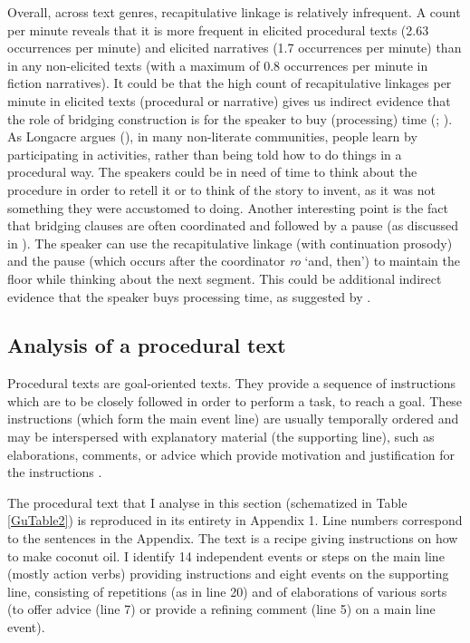 \documentclass[output=paper]{LSP/langsci}
\begin{document}
Overall, across text genres, recapitulative linkage is relatively infrequent. A count per minute reveals that it is more frequent in elicited procedural texts (2.63 occurrences per minute) and elicited narratives (1.7 occurrences per minute) than in any non-elicited texts (with a maximum of 0.8 occurrences per minute in fiction narratives). It could be that the high count of recapitulative linkages per minute in elicited texts (procedural or narrative) gives us indirect evidence that the role of bridging construction is for the speaker to buy (processing) time (\citealt[][378]{devries.2005}; \citeyear[][817]{devries.2006}). As Longacre argues (\citeyear[][9--10]{longacre83}), in many non-literate communities, people learn by participating in activities, rather than being told how to do things in a procedural way. The speakers could be in need of time to think about the procedure in order to retell it or to think of the story to invent, as it was not something they were accustomed to doing. Another interesting point is the fact that bridging clauses are often coordinated and followed by a pause (as discussed in ). The speaker can use the recapitulative linkage (with continuation prosody) and the pause (which occurs after the coordinator \textit{ro} `and, then') to maintain the floor while thinking about the next segment. This could be additional indirect evidence that the speaker buys processing time, as suggested by \citet[][817]{devries.2006}. 


\subsection{Analysis of a procedural text} 
\label{Gusec:procedural}
Procedural texts are goal-oriented texts. They provide a sequence of instructions which are to be closely followed in order to perform a task, to reach a goal. These instructions (which form the main event line) are usually temporally ordered and may be interspersed with explanatory material (the supporting line), such as elaborations, comments, or advice which provide motivation and justification for the instructions \citep{adam01,fontan08,delpech08}. 

The procedural text that I analyse in this section (schematized in Table \ref{GuTable2}) is reproduced in its entirety in Appendix 1. Line numbers correspond to the sentences in the Appendix. The text is a recipe giving instructions on how to make coconut oil. I identify 14 independent events or steps on the main line (mostly action verbs) providing instructions and eight events on the supporting line, consisting of repetitions (as in line 20) and of elaborations of various sorts (to offer advice (line 7) or provide a refining comment (line 5) on a main line event). 
\end{document}
